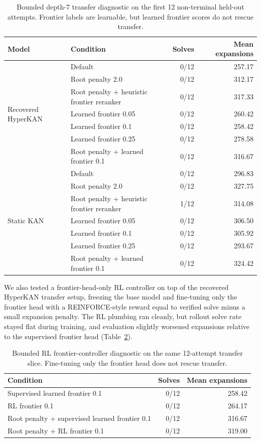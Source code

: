 \documentclass[11pt]{article}
\newcommand{\hyperkan}{HyperKAN}
\newcommand{\staticKAN}{Static KAN}
\begin{document}
\begin{table}[t]
\centering
\caption{Bounded depth-7 transfer diagnostic on the first 12 non-terminal held-out attempts. Frontier labels are learnable, but learned frontier scores do not rescue transfer.}
\label{tab:frontier-transfer}
\small
\begin{tabular}{llrr}
\toprule
Model & Condition & Solves & Mean expansions\\
\midrule
\multirow{7}{*}{Recovered \hyperkan{}}
& Default & 0/12 & 257.17\\
& Root penalty 2.0 & 0/12 & 312.17\\
& Root penalty + heuristic frontier reranker & 0/12 & 317.33\\
& Learned frontier 0.05 & 0/12 & 260.42\\
& Learned frontier 0.1 & 0/12 & 258.42\\
& Learned frontier 0.25 & 0/12 & 278.58\\
& Root penalty + learned frontier 0.1 & 0/12 & 316.67\\
\midrule
\multirow{7}{*}{\staticKAN{}}
& Default & 0/12 & 296.83\\
& Root penalty 2.0 & 0/12 & 327.75\\
& Root penalty + heuristic frontier reranker & 1/12 & 314.08\\
& Learned frontier 0.05 & 0/12 & 306.50\\
& Learned frontier 0.1 & 0/12 & 305.92\\
& Learned frontier 0.25 & 0/12 & 293.67\\
& Root penalty + learned frontier 0.1 & 0/12 & 324.42\\
\bottomrule
\end{tabular}
\normalsize
\end{table}

We also tested a frontier-head-only RL controller on top of the recovered \hyperkan{} transfer setup, freezing the base model and fine-tuning only the frontier head with a REINFORCE-style reward equal to verified solve minus a small expansion penalty. The RL plumbing ran cleanly, but rollout solve rate stayed flat during training, and evaluation slightly worsened expansions relative to the supervised frontier head (Table~\ref{tab:rl-frontier}).

\begin{table}[t]
\centering
\caption{Bounded RL frontier-controller diagnostic on the same 12-attempt transfer slice. Fine-tuning only the frontier head does not rescue transfer.}
\label{tab:rl-frontier}
\begin{tabular}{lrr}
\toprule
Condition & Solves & Mean expansions\\
\midrule
Supervised learned frontier 0.1 & 0/12 & 258.42\\
RL frontier 0.1 & 0/12 & 264.17\\
Root penalty + supervised learned frontier 0.1 & 0/12 & 316.67\\
Root penalty + RL frontier 0.1 & 0/12 & 319.00\\
\bottomrule
\end{tabular}
\end{table}
\end{document}
